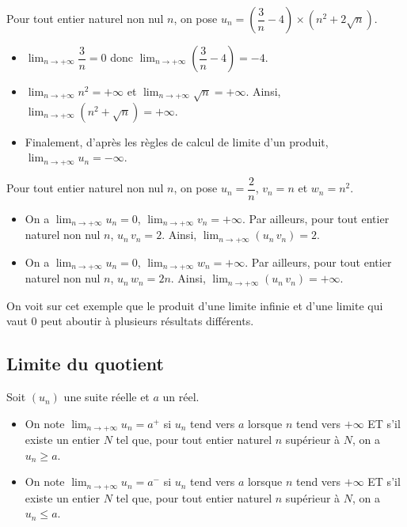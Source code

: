 \documentclass[11pt,fleqn]{book} %
\begin{document}
\begin{example} Pour tout entier naturel non nul $n$, on pose $u_n = \left(\dfrac{3}{n}-4\right)\times (n^2+2\sqrt{n})$.
\begin{itemize}
\item $\displaystyle \lim_{n \to +\infty} \dfrac{3}{n} = 0$ donc $\displaystyle \lim_{n \to +\infty} \left( \dfrac{3}{n}-4 \right) = -4$.
\vskip5pt
\item $\displaystyle \lim_{n \to +\infty} n^2 = +\infty$ et $\displaystyle \lim_{n \to +\infty} \sqrt{n} = +\infty$. Ainsi, $\displaystyle \lim_{n \to +\infty} (n^2+ \sqrt{n})=+\infty$.
\vskip5pt
\item Finalement, d'après les règles de calcul de limite d'un produit, $\displaystyle \lim_{n \to +\infty} u_n = -\infty$.\end{itemize}
\end{example}

\begin{example} Pour tout entier naturel non nul $n$, on pose $u_n=\dfrac{2}{n}$, $v_n=n$ et $w_n=n^2$. 
\begin{itemize}
\item On a $\displaystyle \lim_{n \to +\infty} u_n = 0$, $\displaystyle \lim_{n \to +\infty} v_n = + \infty$. Par ailleurs, pour tout entier naturel non nul $n$, $u_n \, v_n = 2$. Ainsi, $\displaystyle \lim_{n \to +\infty} (u_n \, v_n) = 2$.
\vskip5pt
\item On a $\displaystyle \lim_{n \to +\infty} u_n = 0$, $\displaystyle \lim_{n \to +\infty} w_n = + \infty$. Par ailleurs, pour tout entier naturel non nul $n$, $u_n \, w_n = 2n$. Ainsi, $\displaystyle \lim_{n \to +\infty} (u_n \, v_n) = +\infty$.
\end{itemize} 
On voit sur cet exemple que le produit d'une limite infinie et d'une limite qui vaut 0 peut aboutir à plusieurs résultats différents.\end{example}



\subsection{Limite du quotient}


\begin{definition}Soit $(u_n)$ une suite réelle et $a$ un réel. 

\begin{itemize}
\item On note $\displaystyle\lim_{n \to +\infty}u_n = a^+$ si $u_n$ tend vers $a$ lorsque $n$ tend vers $+\infty$ ET s'il existe un entier $N$ tel que, pour tout entier naturel $n$ supérieur à $N$, on a $u_n \geqslant a$.
\item On note $\displaystyle\lim_{n \to +\infty}u_n = a^-$ si $u_n$ tend vers $a$ lorsque $n$ tend vers $+\infty$ ET s'il existe un entier $N$ tel que, pour tout entier naturel $n$ supérieur à $N$, on a $u_n \leqslant a$.\end{itemize}
\end{definition}
\end{document}
